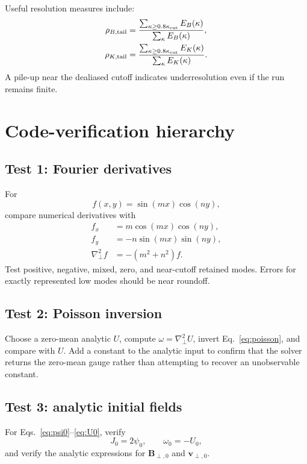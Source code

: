 \documentclass[11pt]{article}
\newcommand{\vect}[1]{\bm{#1}}
\newcommand{\Lap}{\nabla_{\!\perp}^{2}}
\begin{document}
Useful resolution measures include:
\begin{align}
\rho_{B,\rm tail}
&=\frac{\sum_{\kappa\ge0.8\kappa_{\rm cut}}E_B(\kappa)}
{\sum_{\kappa}E_B(\kappa)},\\
\rho_{K,\rm tail}
&=\frac{\sum_{\kappa\ge0.8\kappa_{\rm cut}}E_K(\kappa)}
{\sum_{\kappa}E_K(\kappa)}.
\end{align}
A pile-up near the dealiased cutoff indicates underresolution even if the run remains finite.

\section{Code-verification hierarchy}
\label{sec:verification}

\subsection{Test 1: Fourier derivatives}

For
\begin{equation}
f(x,y)=\sin(mx)\cos(ny),
\end{equation}
compare numerical derivatives with
\begin{align}
f_x&=m\cos(mx)\cos(ny),\\
f_y&=-n\sin(mx)\sin(ny),\\
\Lap f&=-(m^2+n^2)f.
\end{align}
Test positive, negative, mixed, zero, and near-cutoff retained modes. Errors for exactly represented low modes should be near roundoff.

\subsection{Test 2: Poisson inversion}

Choose a zero-mean analytic $U$, compute $\omega=\Lap U$, invert Eq.~\eqref{eq:poisson}, and compare with $U$. Add a constant to the analytic input to confirm that the solver returns the zero-mean gauge rather than attempting to recover an unobservable constant.

\subsection{Test 3: analytic initial fields}

For Eqs.~\eqref{eq:psi0}--\eqref{eq:U0}, verify
\begin{equation}
J_0=2\psi_0,\qquad
\omega_0=-U_0,
\end{equation}
and verify the analytic expressions for $\vect{B}_{\perp,0}$ and $\vect{v}_{\perp,0}$.
\end{document}
